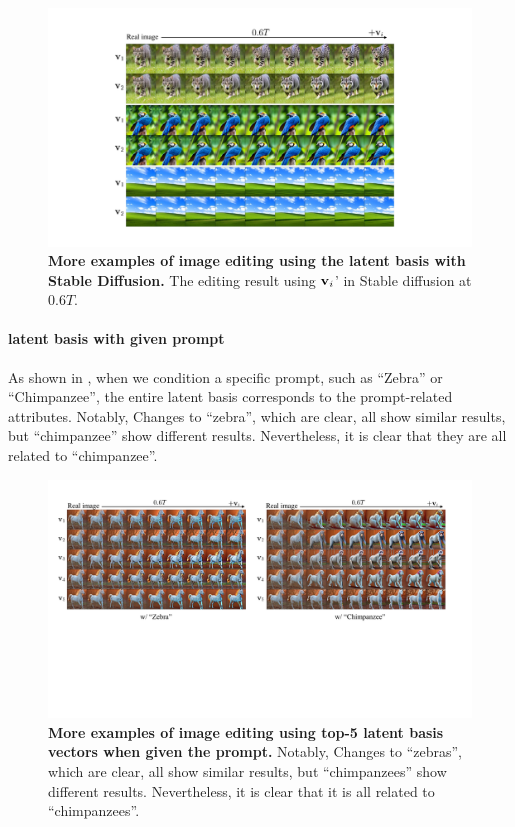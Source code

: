 \begin{figure}[!h]
    \centering
    \includegraphics[width=1.0\linewidth]{figure/stable_6T.pdf}
    \caption{
    \textbf{More examples of image editing using the latent basis with Stable Diffusion.} The editing result using $\mathbf{v}_i$' in Stable diffusion at 0.6$T$.}
    \label{fig:stable_6T}
\end{figure}


\paragraph{latent basis with given prompt}
As shown in , when we condition a specific prompt, such as ``Zebra'' or ``Chimpanzee'', the entire latent basis corresponds to the prompt-related attributes.
Notably, Changes to ``zebra'', which are clear, all show similar results, but ``chimpanzee'' show different results. Nevertheless, it is clear that they are all related to ``chimpanzee''.

 

\begin{figure}[!h]
    \centering
    \includegraphics[width=1.0\linewidth]{figure/stable_various_vis.pdf}
    \vspace{-2em}
    \caption{
    \textbf{More examples of image editing using top-5 latent basis vectors when given the prompt.} Notably, Changes to ``zebras'', which are clear, all show similar results, but ``chimpanzees'' show different results. Nevertheless, it is clear that it is all related to ``chimpanzees''.}
    \label{fig:stable_various_vis}
\end{figure}



